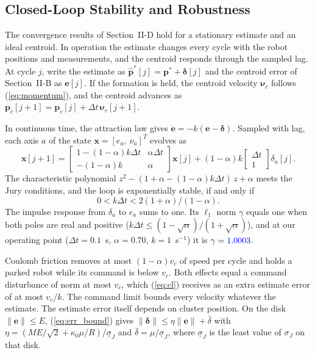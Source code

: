 \documentclass[lettersize,journal]{IEEEtran}
\newcommand{\rev}[1]{\textcolor{blue}{#1}}           %
\begin{document}
\subsection{Closed-Loop Stability and Robustness}

The convergence results of Section~II-D hold for a stationary estimate and an ideal centroid. In operation the estimate changes every cycle with the robot positions and measurements, and the centroid responds through the sampled lag. At cycle $j$, write the estimate as $\hat{\mathbf{p}}^*[j] = \mathbf{p}^* + \boldsymbol{\delta}[j]$ and the centroid error of Section~II-B as $\mathbf{e}[j]$. If the formation is held, the centroid velocity $\boldsymbol{\nu}_c$ follows (\ref{eq:momentum}), and the centroid advances as $\mathbf{p}_c[j+1] = \mathbf{p}_c[j] + \Delta t\,\boldsymbol{\nu}_c[j+1]$.

In continuous time, the attraction law gives $\dot{\mathbf{e}} = -k(\mathbf{e} - \boldsymbol{\delta})$. Sampled with lag, each axis $a$ of the state $\mathbf{x} = [e_a,\ \nu_a]^T$ evolves as
\begin{equation}\label{eq:cl}
\mathbf{x}[j{+}1] = \begin{bmatrix} 1{-}(1{-}\alpha)k\Delta t & \alpha\Delta t \\ -(1{-}\alpha)k & \alpha \end{bmatrix}\mathbf{x}[j] + (1{-}\alpha)k\begin{bmatrix}\Delta t\\ 1\end{bmatrix}\delta_a[j].
\end{equation}
The characteristic polynomial $z^2 - (1+\alpha-(1-\alpha)k\Delta t)\,z + \alpha$ meets the Jury conditions, and the loop is exponentially stable, if and only if
\begin{equation}\label{eq:kmax}
0 < k\Delta t < 2(1+\alpha)/(1-\alpha).
\end{equation}
The impulse response from $\delta_a$ to $e_a$ sums to one. Its $\ell_1$ norm $\gamma$ equals one when both poles are real and positive ($k\Delta t \le (1-\sqrt{\alpha})/(1+\sqrt{\alpha})$), and at our operating point ($\Delta t = 0.1$~s, $\alpha = 0.70$, $k = 1$~s$^{-1}$) it is $\gamma = \rev{1.0003}$. %

Coulomb friction removes at most $(1-\alpha)v_c$ of speed per cycle and holds a parked robot while its command is below $v_c$. Both effects equal a command disturbance of norm at most $v_c$, which (\ref{eq:cl}) receives as an extra estimate error of at most $v_c/k$. The command limit bounds every velocity whatever the estimate. The estimate error itself depends on cluster position. On the disk $\|\mathbf{e}\| \le E$, (\ref{eq:err_bound}) gives $\|\boldsymbol{\delta}\| \le \eta\|\mathbf{e}\| + \bar{\delta}$ with $\eta = (ME/\sqrt{2} + \kappa_0\mu/R)/\underline{\sigma}_J$ and $\bar{\delta} = \mu/\underline{\sigma}_J$, where $\underline{\sigma}_J$ is the least value of $\sigma_J$ on that disk.
\end{document}
